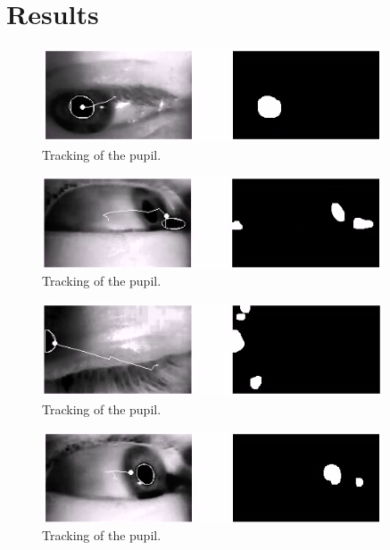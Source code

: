\section{Results}\label{results}

\begin{figure}[H]
  \centering
  \includegraphics[width=0.9\textwidth]{fin_dark.png}
  \caption{Tracking of the pupil.}\label{fig:pupil1}
\end{figure}

\begin{figure}[H]
  \centering
  \includegraphics[width=0.9\textwidth]{fin_lost.png}
  \caption{Tracking of the pupil.}\label{fig:pupil1}
\end{figure}

\begin{figure}[H]
  \centering
  \includegraphics[width=0.9\textwidth]{fin_closed.png}
  \caption{Tracking of the pupil.}\label{fig:pupil1}
\end{figure}

\begin{figure}[H]
  \centering
  \includegraphics[width=0.9\textwidth]{fin_temporal.png}
  \caption{Tracking of the pupil.}\label{fig:pupil1}
\end{figure}


